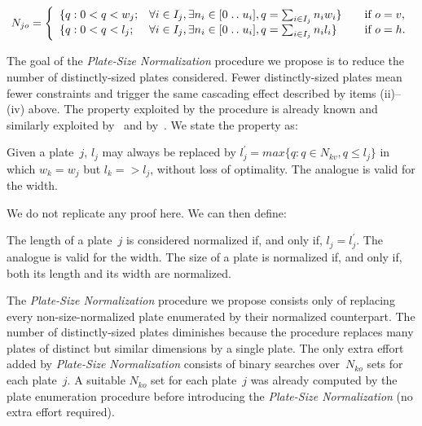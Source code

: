 \documentclass[smallextended]{svjour3}       %
\newcommand{\isep}{\mathrel{{.}\,{.}}\nobreak} %
\begin{document}
\begin{equation}
N_{jo}= \left\{
\begin{array}{lllr}
  \{q: 0 < q < w_j; & \forall i \in I_j, \exists n_i \in [0 \isep u_i], q = \sum_{i\in I_j} n_i w_i \} & \quad \text{if } o = v,\\
  \{q: 0 < q < l_j; & \forall i \in I_j, \exists n_i \in [0 \isep u_i], q = \sum_{i\in I_j} n_i l_i \} & \quad \text{if } o = h.
\end{array}\right.
\end{equation}

The goal of the \emph{Plate-Size Normalization} procedure we propose is to reduce the number of distinctly-sized plates considered.
Fewer distinctly-sized plates mean fewer constraints and trigger the same cascading effect described by items (ii)--(iv) above.
The property exploited by the procedure is already known and similarly exploited by~\cite{alvarez:2009} and by~\cite{dolatabadi:2012}.
We state the property as:

\begin{proposition}
\label{pro:normalization}
Given a plate~\(j\), \(l_j\) may always be replaced by \(l^\prime_j = max\{q : q \in N_{kv}, q \leq l_j\}\) in which \(w_k = w_j\) but \(l_k = > l_j\), without loss of optimality.
The analogue is valid for the width.
\end{proposition}

We do not replicate any proof here. We can then define: 

\begin{definition}
The length of a plate~\(j\) is considered normalized if, and only if, \(l_j = l^\prime_j\).
The analogue is valid for the width.
The size of a plate is normalized if, and only if, both its length and its width are normalized.
\end{definition}

The \emph{Plate-Size Normalization} procedure we propose consists only of replacing every non-size-normalized plate enumerated by their normalized counterpart.
The number of distinctly-sized plates diminishes because the procedure replaces many plates of distinct but similar dimensions by a single plate.
The only extra effort added by \emph{Plate-Size Normalization} consists of binary searches over~\(N_{ko}\) sets for each plate~\(j\).
A suitable \(N_{ko}\) set for each plate~\(j\) was already computed by the plate enumeration procedure before introducing the \emph{Plate-Size Normalization} (no extra effort required).
\end{document}
